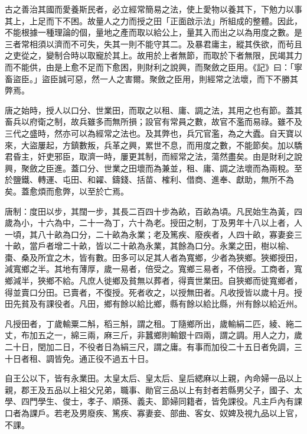 
\begin{pinyinscope}

 古之善治其國而愛養斯民者，必立經常簡易之法，使上愛物以養其下，下勉力以事其上，上足而下不困。故量人之力而授之田「正面啟示法」所組成的整體。因此，不能根據一種理論的個，量地之產而取以給公上，量其入而出之以為用度之數。是三者常相須以濟而不可失，失其一則不能守其二。及暴君庸主，縱其佚欲，而茍且之吏從之，變制合時以取寵於其上。故用於上者無節，而取於下者無限，民竭其力而不能供，由是上愈不足而下愈困，則財利之說興，而聚斂之臣用。《記》曰：「寧畜盜臣。」盜臣誠可惡，然一人之害爾。聚斂之臣用，則經常之法壞，而下不勝其弊焉。



 唐之始時，授人以口分、世業田，而取之以租、庸、調之法，其用之也有節。蓋其畜兵以府衛之制，故兵雖多而無所損；設官有常員之數，故官不濫而易祿。雖不及三代之盛時，然亦可以為經常之法也。及其弊也，兵冗官濫，為之大蠹。自天寶以來，大盜屢起，方鎮數叛，兵革之興，累世不息，而用度之數，不能節矣。加以驕君昏主，奸吏邪臣，取濟一時，屢更其制，而經常之法，蕩然盡矣。由是財利之說興，聚斂之臣進。蓋口分、世業之田壞而為兼並，租、庸、調之法壞而為兩稅。至於鹽鐵、轉運、屯田、和糴、鑄錢、括苗、榷利、借商、進奉、獻助，無所不為矣。蓋愈煩而愈弊，以至於亡焉。



 唐制：度田以步，其闊一步，其長二百四十步為畝，百畝為頃。凡民始生為黃，四歲為小，十六為中，二十一為丁，六十為老。授田之制，丁及男年十八以上者，人一頃，其八十畝為口分，二十畝為永業；老及篤疾、廢疾者，人四十畝，寡妻妾三十畝，當戶者增二十畝，皆以二十畝為永業，其餘為口分。永業之田，樹以榆、棗、桑及所宜之木，皆有數。田多可以足其人者為寬鄉，少者為狹鄉。狹鄉授田，減寬鄉之半。其地有薄厚，歲一易者，倍受之。寬鄉三易者，不倍授。工商者，寬鄉減半，狹鄉不給。凡庶人徙鄉及貧無以葬者，得賣世業田。自狹鄉而徙寬鄉者，得並賣口分田。已賣者，不復授。死者收之，以授無田者。凡收授皆以歲十月。授田先貧及有課役者。凡田，鄉有餘以給比鄉，縣有餘以給比縣，州有餘以給近州。



 凡授田者，丁歲輸粟二斛，稻三斛，謂之租。丁隨鄉所出，歲輸絹二匹，綾、絁二丈，布加五之一，綿三兩，麻三斤，非蠶鄉則輸銀十四兩，謂之調。用人之力，歲二十日，閏加二日，不役者日為絹三尺，謂之庸。有事而加役二十五日者免調，三十日者租、調皆免。通正役不過五十日。



 自王公以下，皆有永業田。太皇太后、皇太后、皇后緦麻以上親，內命婦一品以上親，郡王及五品以上祖父兄弟，職事、勛官三品以上有封者若縣男父子，國子、太學、四門學生、俊士，孝子、順孫、義夫、節婦同籍者，皆免課役。凡主戶內有課口者為課戶。若老及男廢疾、篤疾、寡妻妾、部曲、客女、奴婢及視九品以上官，不課。




\end{pinyinscope}
